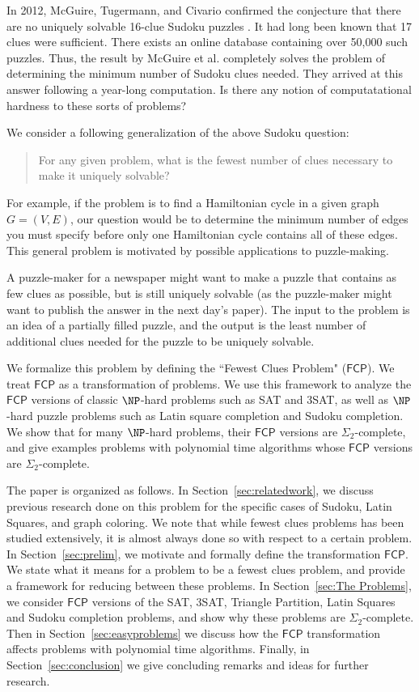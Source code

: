 \documentclass[runningheads,a4paper]{llncs}
\begin{document}
In 2012, McGuire, Tugermann, and Civario confirmed the conjecture that there are no uniquely solvable 16-clue Sudoku puzzles \cite{mcguire2012there}. It had long been known that 17 clues were sufficient. There exists an online database containing over 50,000 such puzzles. Thus, the result by McGuire et al. completely solves the problem of determining the minimum number of Sudoku clues needed. They arrived at this answer following a year-long computation. Is there any notion of computatational hardness to these sorts of problems?

We consider a following generalization of the above Sudoku question: 
\begin{quote}
For any given problem, what is the fewest number of clues necessary to make it uniquely solvable?
\end{quote}

For example, if the problem is to find a Hamiltonian cycle in a given graph $G = (V,E)$, our question would be to determine the minimum number of edges you must specify before only one Hamiltonian cycle contains all of these edges. This general problem is motivated by possible applications to puzzle-making. 

A puzzle-maker for a newspaper might want to make a puzzle that contains as few clues as possible, but is still uniquely solvable (as the puzzle-maker might want to publish the answer in the next day's paper). The input to the problem is an idea of a partially filled puzzle, and the output is the least number of additional clues needed for the puzzle to be uniquely solvable.

We formalize this problem by defining the ``Fewest Clues Problem" ($\mathsf{FCP}$). We treat $\mathsf{FCP}$ as a transformation of problems. We use this framework to analyze the $\mathsf{FCP}$ versions of classic $\NP$-hard problems such as SAT and 3SAT, as well as $\NP$-hard puzzle problems such as Latin square completion and Sudoku completion. We show that for many $\NP$-hard problems, their $\mathsf{FCP}$ versions are $\Sigma_2$-complete, and give examples problems with polynomial time algorithms whose $\mathsf{FCP}$ versions are $\Sigma_2$-complete.

The paper is organized as follows. In Section~\ref{sec:relatedwork}, we discuss previous research done on this problem for the specific cases of Sudoku, Latin Squares, and graph coloring. We note that while fewest clues problems has been studied extensively, it is almost always done so with respect to a certain problem. In Section~\ref{sec:prelim}, we motivate and formally define the transformation $\mathsf{FCP}$. We state what it means for a problem to be a fewest clues problem, and provide a framework for reducing between these problems. In Section~\ref{sec:The Problems}, we consider $\mathsf{FCP}$ versions of the SAT, 3SAT, Triangle Partition, Latin Squares and Sudoku completion problems, and show why these problems are $\Sigma_2$-complete. Then in Section~\ref{sec:easyproblems} we discuss how the $\mathsf{FCP}$ transformation affects problems with polynomial time algorithms. Finally, in Section~\ref{sec:conclusion} we give concluding remarks and ideas for further research.
\end{document}
